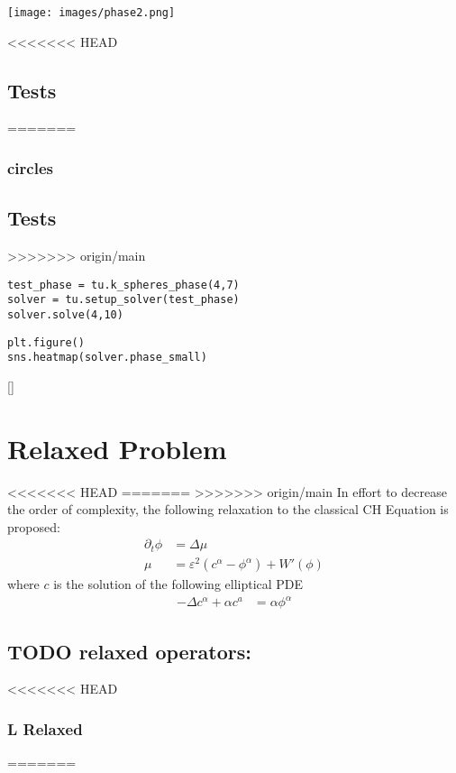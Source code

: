 \documentclass[11pt]{article}
\begin{document}
\begin{center}
\texttt{[image: images/phase2.png]}
\end{center}
<<<<<<< HEAD
\subsection{Tests}
\label{sec:org7dc5850}
=======
\subsubsection{circles}
\label{sec:org4aa1f6d}
\subsection{Tests}
\label{sec:orgb49f240}
>>>>>>> origin/main

\begin{verbatim}
test_phase = tu.k_spheres_phase(4,7)
solver = tu.setup_solver(test_phase)
solver.solve(4,10)
\end{verbatim}

\begin{verbatim}
plt.figure()
sns.heatmap(solver.phase_small)
\end{verbatim}
[]
\section{Relaxed Problem}
<<<<<<< HEAD
\label{sec:org38cea0d}
=======
\label{sec:org24e0cd8}
>>>>>>> origin/main
In effort to decrease the order of complexity, the following relaxation to the classical CH Equation is proposed:
\begin{align*}
\partial_t \phi  &= \Delta \mu \\
\mu &= \varepsilon ^2(c^\alpha - \phi^\alpha) + W'(\phi)
\end{align*}
where \(c\) is the solution of the following elliptical PDE
\begin{align*}
- \Delta c^\alpha  + \alpha c^a &= \alpha \phi ^\alpha
\end{align*}
\subsection{{\bfseries\sffamily TODO} relaxed operators:}
<<<<<<< HEAD
\label{sec:org5a89b64}
\subsubsection{L Relaxed}
\label{sec:orgf7bb500}
=======
\label{sec:org8087e9a}
\end{document}
